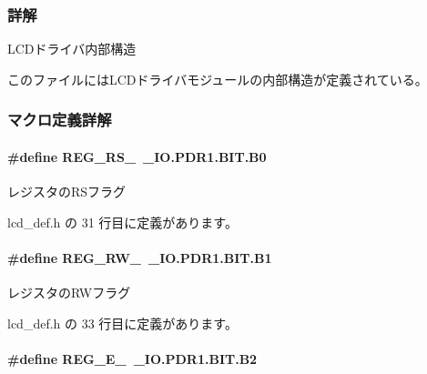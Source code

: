 \subsubsection{詳解}
L\+C\+Dドライバ内部構造 

このファイルには\+L\+C\+Dドライバモジュールの内部構造が定義されている。

 

\subsubsection{マクロ定義詳解}
\paragraph[{R\+E\+G\+\_\+\+R\+S\+\_\+}]{\setlength{\rightskip}{0pt plus 5cm}\#define R\+E\+G\+\_\+\+R\+S\+\_\+~\+\_\+\+I\+O.\+P\+D\+R1.\+B\+I\+T.\+B0}\label{lcd__def_8h_aa18b7c557b2b495f552189b74340f7a1_aa18b7c557b2b495f552189b74340f7a1}


レジスタの\+R\+Sフラグ 



 lcd\+\_\+def.\+h の 31 行目に定義があります。

\paragraph[{R\+E\+G\+\_\+\+R\+W\+\_\+}]{\setlength{\rightskip}{0pt plus 5cm}\#define R\+E\+G\+\_\+\+R\+W\+\_\+~\+\_\+\+I\+O.\+P\+D\+R1.\+B\+I\+T.\+B1}\label{lcd__def_8h_ac8bbcd8783d3c1fb361aaafc6da6c1c6_ac8bbcd8783d3c1fb361aaafc6da6c1c6}


レジスタの\+R\+Wフラグ 



 lcd\+\_\+def.\+h の 33 行目に定義があります。

\paragraph[{R\+E\+G\+\_\+\+E\+\_\+}]{\setlength{\rightskip}{0pt plus 5cm}\#define R\+E\+G\+\_\+\+E\+\_\+~\+\_\+\+I\+O.\+P\+D\+R1.\+B\+I\+T.\+B2}\label{lcd__def_8h_a450bb88fc561fac83cf5bbd024ce9747_a450bb88fc561fac83cf5bbd024ce9747}


